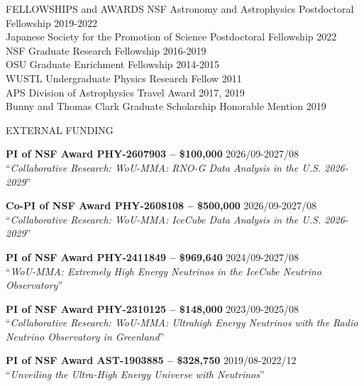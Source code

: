 \documentclass{resume} %
\begin{document}
\begin{rSection}{FELLOWSHIPS and AWARDS}
NSF Astronomy and Astrophysics Postdoctoral Fellowship \hfill 2019-2022 \\
Japanese Society for the Promotion of Science Postdoctoral Fellowship \hfill 2022 \\
NSF Graduate Research Fellowship \hfill 2016-2019 \\
OSU Graduate Enrichment Fellowship \hfill 2014-2015 \\
WUSTL Undergraduate Physics Research Fellow \hfill 2011 \\
APS Division of Astrophysics Travel Award \hfill 2017, 2019 \\
Bunny and Thomas Clark Graduate Scholarship Honorable Mention \hfill 2019


\end{rSection}

\begin{rSection}{EXTERNAL FUNDING}

\textbf{PI of NSF Award PHY-2607903 -- \$100,000} \hfill 2026/09-2027/08\\
``\textit{Collaborative Research: WoU-MMA: RNO-G Data Analysis in the U.S. 2026-2029}'' 

\textbf{Co-PI of NSF Award PHY-2608108 -- \$500,000} \hfill 2026/09-2027/08\\
``\textit{Collaborative Research: WoU-MMA: IceCube Data Analysis in the U.S. 2026-2029}'' 

\textbf{PI of NSF Award PHY-2411849 -- \$969,640} \hfill 2024/09-2027/08\\
``\textit{WoU-MMA: Extremely High Energy Neutrinos in the IceCube Neutrino Observatory}'' 

\textbf{PI of NSF Award PHY-2310125 -- \$148,000} \hfill 2023/09-2025/08\\
``\textit{Collaborative Research: WoU-MMA: Ultrahigh Energy Neutrinos with the Radio Neutrino Observatory in Greenland}'' 

\textbf{PI of NSF Award AST-1903885 -- \$328,750} \hfill 2019/08-2022/12 \\
``\textit{Unveiling the Ultra-High Energy Universe with Neutrinos}'' \\


\end{rSection}
\end{document}
